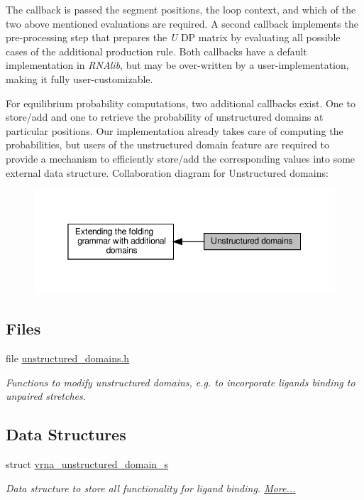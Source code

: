 The callback is passed the segment positions, the loop context, and which of the two above mentioned evaluations are required. A second callback implements the pre-\/processing step that prepares the {\itshape U} DP matrix by evaluating all possible cases of the additional production rule. Both callbacks have a default implementation in {\itshape R\+N\+Alib}, but may be over-\/written by a user-\/implementation, making it fully user-\/customizable.

For equilibrium probability computations, two additional callbacks exist. One to store/add and one to retrieve the probability of unstructured domains at particular positions. Our implementation already takes care of computing the probabilities, but users of the unstructured domain feature are required to provide a mechanism to efficiently store/add the corresponding values into some external data structure. Collaboration diagram for Unstructured domains\+:
\nopagebreak
\begin{figure}[H]
\begin{center}
\leavevmode
\includegraphics[width=350pt]{group__domains__up}
\end{center}
\end{figure}
\subsection*{Files}
\begin{DoxyCompactItemize}
\item 
file \hyperlink{unstructured__domains_8h}{unstructured\+\_\+domains.\+h}
\begin{DoxyCompactList}\small\item\em Functions to modify unstructured domains, e.\+g. to incorporate ligands binding to unpaired stretches. \end{DoxyCompactList}\end{DoxyCompactItemize}
\subsection*{Data Structures}
\begin{DoxyCompactItemize}
\item 
struct \hyperlink{group__domains__up_structvrna__unstructured__domain__s}{vrna\+\_\+unstructured\+\_\+domain\+\_\+s}
\begin{DoxyCompactList}\small\item\em Data structure to store all functionality for ligand binding.  \hyperlink{group__domains__up_structvrna__unstructured__domain__s}{More...}\end{DoxyCompactList}\end{DoxyCompactItemize}
